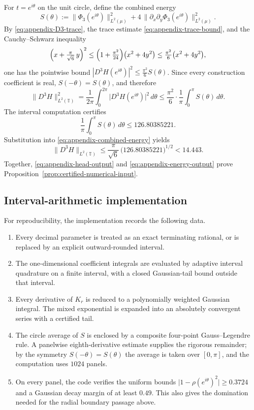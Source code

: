 For $t=e^{i\theta}$ on the unit circle, define the combined energy
\[
  S(\theta)
  :=\bigl\|\Phi_3(e^{i\theta})\bigr\|_{L^2(\mu)}^2
  +4\,\bigl\|\partial_x\partial_y\Phi_3(e^{i\theta})\bigr\|_{L^2(\mu)}^2.
\]
By \eqref{eq:appendix-D3-trace}, the trace estimate
\eqref{eq:appendix-trace-bound}, and the Cauchy--Schwarz inequality
\[
  \Bigl(x+\tfrac{\pi}{\sqrt6}\,y\Bigr)^2
  \le\Bigl(1+\tfrac{\pi^2}{24}\Bigr)\bigl(x^2+4y^2\bigr)
  \le\tfrac{\pi^2}{6}\bigl(x^2+4y^2\bigr),
\]
one has the pointwise bound
$|D^3H(e^{i\theta})|^2\le\tfrac{\pi^2}{6}S(\theta)$.  Since every
construction coefficient is real, $S(-\theta)=S(\theta)$, and therefore
\begin{equation}
  \|D^3H\|_{L^2(\mathbb T)}^2
  =\frac{1}{2\pi}\int_0^{2\pi}
  \bigl|D^3H(e^{i\theta})\bigr|^2\,d\theta
  \le\frac{\pi^2}{6}\cdot\frac{1}{\pi}\int_0^{\pi}S(\theta)\,d\theta.
  \label{eq:appendix-combined-energy}
\end{equation}
The interval computation certifies
\[
  \frac{1}{\pi}\int_0^{\pi}S(\theta)\,d\theta
  \le126.80385221.
\]
Substitution into \eqref{eq:appendix-combined-energy} yields
\begin{equation}
  \|D^3H\|_{L^2(\mathbb T)}
  \le\frac{\pi}{\sqrt6}\,\bigl(126.80385221\bigr)^{1/2}
  <14.443.
  \label{eq:appendix-energy-output}
\end{equation}
Together, \eqref{eq:appendix-head-output} and
\eqref{eq:appendix-energy-output} prove
Proposition~\ref{prop:certified-numerical-input}.

\subsection{Interval-arithmetic implementation}
\label{app:certification-implementation}

For reproducibility, the implementation records the following data.

\begin{enumerate}
  \item Every decimal parameter is treated as an exact terminating rational,
  or is replaced by an explicit outward-rounded interval.
  \item The one-dimensional coefficient integrals are evaluated by adaptive
  interval quadrature on a finite interval, with a closed Gaussian-tail bound
  outside that interval.
  \item Every derivative of $K_r$ is reduced to a polynomially weighted
  Gaussian integral.  The mixed exponential is expanded into an absolutely
  convergent series with a certified tail.
  \item The circle average of $S$ is enclosed by a composite four-point
  Gauss--Legendre rule.  A panelwise eighth-derivative estimate supplies the
  rigorous remainder; by the symmetry $S(-\theta)=S(\theta)$ the average is
  taken over $[0,\pi]$, and the computation uses $1024$ panels.
  \item On every panel, the code verifies the uniform bounds
  $\lvert1-\rho(e^{i\theta})^2\rvert\ge0.3724$ and a Gaussian decay margin of
  at least $0.49$.  This also gives the domination needed for the radial
  boundary passage above.
\end{enumerate}

